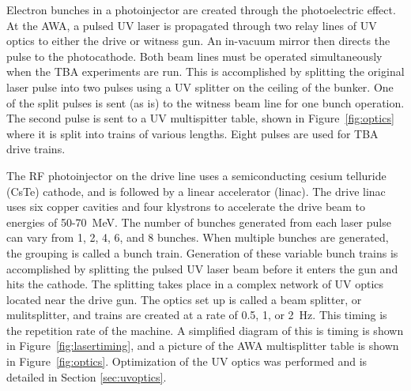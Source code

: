 Electron bunches in a photoinjector are created through the photoelectric effect. 
At the AWA, a pulsed UV laser is propagated through two relay lines of UV optics to either
the drive or witness gun. An in-vacuum mirror then directs the pulse to the photocathode.
Both beam lines must be operated simultaneously when the TBA experiments are run. This is accomplished by
splitting the original laser pulse into two pulses using a UV splitter on the 
ceiling of the bunker. One of the split pulses is sent (as is) to the witness beam line for one
bunch operation. The second pulse is sent to a UV multispitter table, shown in 
Figure~\ref{fig:optics} where it is split into trains of various lengths. Eight pulses are 
used for TBA drive trains.

The RF photoinjector on the drive line uses a semiconducting
cesium telluride (CsTe) cathode, and is followed by a linear accelerator (linac). The
drive linac uses six copper cavities and four klystrons to accelerate the drive beam
to energies of 50-\SI{70}{MeV}. The number of bunches generated from each 
laser pulse can vary from 1, 2, 4, 6, and 8 bunches. When multiple bunches
are generated, the grouping is called a bunch train. Generation of
these variable bunch trains is accomplished by splitting the pulsed
UV laser beam before it enters the gun and hits the cathode. The splitting
takes place in a complex network of UV optics located near the drive
gun. The optics set up is called a beam splitter, or mulitsplitter,
and trains are created at a rate of 0.5, 1, or \SI{2}{Hz}. 
This timing is the repetition rate of the machine. 
A simplified diagram of this is timing is shown in Figure~\ref{fig:lasertiming}, 
and a picture of the AWA multisplitter table is shown in Figure~\ref{fig:optics}. 
Optimization of the UV optics was performed and is detailed in Section \ref{sec:uvoptics}.  
